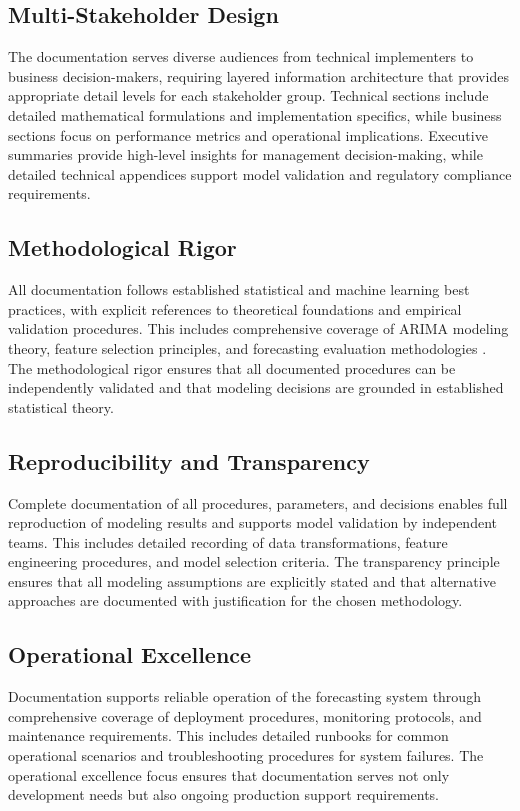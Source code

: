 \subsection{Multi-Stakeholder Design}
The documentation serves diverse audiences from technical implementers to business decision-makers, requiring layered information architecture that provides appropriate detail levels for each stakeholder group. Technical sections include detailed mathematical formulations and implementation specifics, while business sections focus on performance metrics and operational implications. Executive summaries provide high-level insights for management decision-making, while detailed technical appendices support model validation and regulatory compliance requirements.

\subsection{Methodological Rigor}
All documentation follows established statistical and machine learning best practices, with explicit references to theoretical foundations and empirical validation procedures. This includes comprehensive coverage of ARIMA modeling theory, feature selection principles, and forecasting evaluation methodologies \cite{Box:2016}\cite{Guyon:2003}. The methodological rigor ensures that all documented procedures can be independently validated and that modeling decisions are grounded in established statistical theory.

\subsection{Reproducibility and Transparency}
Complete documentation of all procedures, parameters, and decisions enables full reproduction of modeling results and supports model validation by independent teams. This includes detailed recording of data transformations, feature engineering procedures, and model selection criteria. The transparency principle ensures that all modeling assumptions are explicitly stated and that alternative approaches are documented with justification for the chosen methodology.

\subsection{Operational Excellence}
Documentation supports reliable operation of the forecasting system through comprehensive coverage of deployment procedures, monitoring protocols, and maintenance requirements. This includes detailed runbooks for common operational scenarios and troubleshooting procedures for system failures. The operational excellence focus ensures that documentation serves not only development needs but also ongoing production support requirements.

